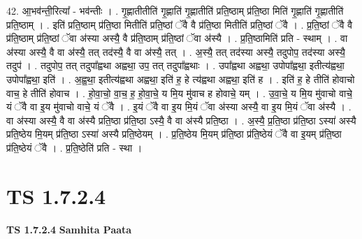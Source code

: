 \documentclass[17pt]{extarticle}
\begin{document}
42. आ॒भव॑न्ती॒रित्या᳚ - भव॑न्तीः । . गृ॒ह्णातीतीति॑ गृ॒ह्णाति॑ गृ॒ह्णातीति॑ प्रति॒ष्ठाम् प्र॑ति॒ष्ठा मिति॑ गृ॒ह्णाति॑ गृ॒ह्णातीति॑ प्रति॒ष्ठाम् । . इति॑ प्रति॒ष्ठाम् प्र॑ति॒ष्ठा मितीति॑ प्रति॒ष्ठां ॅवै वै प्र॑ति॒ष्ठा मितीति॑ प्रति॒ष्ठां ॅवै । . प्र॒ति॒ष्ठां ॅवै वै प्र॑ति॒ष्ठाम् प्र॑ति॒ष्ठां ॅवा अ॑स्या अस्यै॒ वै प्र॑ति॒ष्ठाम् प्र॑ति॒ष्ठां ॅवा अ॑स्यै । . प्र॒ति॒ष्ठामिति॑ प्रति - स्थाम् । . वा अ॑स्या अस्यै॒ वै वा अ॑स्यै॒ तत् तद॑स्यै॒ वै वा अ॑स्यै॒ तत् । . अ॒स्यै॒ तत् तद॑स्या अस्यै॒ तदुपोप॒ तद॑स्या अस्यै॒ तदुप॑ । . तदुपोप॒ तत् तदुपा᳚ह्वथा अह्वथा॒ उप॒ तत् तदुपा᳚ह्वथाः । . उपा᳚ह्वथा अह्वथा॒ उपोपा᳚ह्वथा॒ इतीत्य॑ह्वथा॒ उपोपा᳚ह्वथा॒ इति॑ । . अ॒ह्व॒था॒ इतीत्य॑ह्वथा अह्वथा॒ इति॑ ह॒ हे त्य॑ह्वथा अह्वथा॒ इति॑ ह । . इति॑ ह॒ हे तीति॑ होवाचो वाच॒ हे तीति॑ होवाच । . हो॒वा॒चो॒ वा॒च॒ ह॒ हो॒वा॒चे॒ य मि॒य मु॑वाच ह होवाचे॒ यम् । . उ॒वा॒चे॒ य मि॒य मु॑वाचो वाचे॒ यं ॅवै वा इ॒य मु॑वाचो वाचे॒ यं ॅवै । . इ॒यं ॅवै वा इ॒य मि॒यं ॅवा अ॑स्या अस्यै॒ वा इ॒य मि॒यं ॅवा अ॑स्यै । . वा अ॑स्या अस्यै॒ वै वा अ॑स्यै प्रति॒ष्ठा प्र॑ति॒ष्ठा ऽस्यै॒ वै वा अ॑स्यै प्रति॒ष्ठा । . अ॒स्यै॒ प्र॒ति॒ष्ठा प्र॑ति॒ष्ठा ऽस्या॑ अस्यै प्रति॒ष्ठेय मि॒यम् प्र॑ति॒ष्ठा ऽस्या॑ अस्यै प्रति॒ष्ठेयम् । . प्र॒ति॒ष्ठेय मि॒यम् प्र॑ति॒ष्ठा प्र॑ति॒ष्ठेयं ॅवै वा इ॒यम् प्र॑ति॒ष्ठा प्र॑ति॒ष्ठेयं ॅवै । . प्र॒ति॒ष्ठेति॑ प्रति - स्था । \newline
\pagebreak
{}
\section*{ TS 1.7.2.4 }

\textbf{TS 1.7.2.4 } \newline
\textbf{Samhita Paata} \newline
\end{document}
